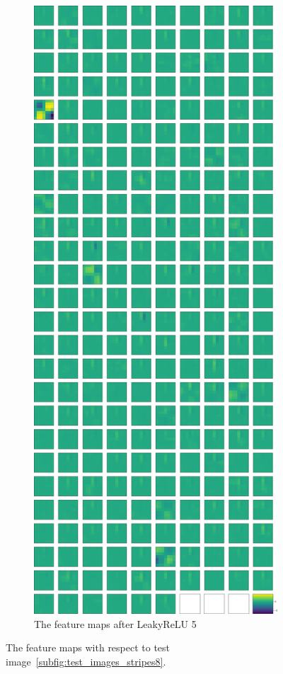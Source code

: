 \documentclass{beamer}
\begin{document}
\begin{frame}
\begin{figure}
\begin{subfigure}{0.45\textwidth}
\centering
\includegraphics[height=.8\textheight]{images/stripes/test_img_9/max_pooling2d_3.png}
\caption{The feature maps after LeakyReLU 5}
\label{subfig:stripes_test_img_maxpool3}
\end{subfigure}
\caption[Feature Map Stripes on Test Images]{The feature maps with respect to test image~\ref{subfig:test_images_stripes8}.}
\end{figure}
\end{frame}
\end{document}
